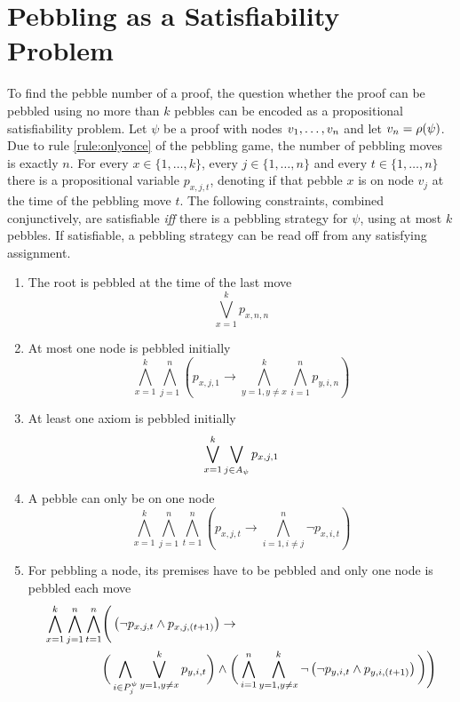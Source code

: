 \documentclass{llncs}
\begin{document}
\section{Pebbling as a Satisfiability Problem}
\label{sec:PebblingAsSat}

To find the pebble number of a proof, the question whether the proof can be pebbled using no more than $k$ pebbles can be encoded as a propositional satisfiability problem.
Let $\psi$ be a proof with nodes $v_1,\ldots,v_n$ and let $v_n = \rho(\psi)$. 
Due to rule \ref{rule:onlyonce} of the pebbling game, the number of pebbling moves is exactly $n$. For every $x \in \{1,\ldots,k\}$, every $j \in \{1,\ldots,n\}$ and every $t \in \{1,\ldots,n\}$ there is a propositional variable $p_{x,j,t}$, denoting if that pebble $x$ is on node $v_j$ at the time of the pebbling move $t$. The following constraints, combined conjunctively, are satisfiable \textit{iff} there is a pebbling strategy for $\psi$, using at most $k$ pebbles. If satisfiable, a pebbling strategy can be read off from any satisfying assignment.

\begin{enumerate}
	\item The root is pebbled at the time of the last move
				$$\bigvee_{x = 1}^k p_{x,n,n}$$
				
	\item At most one node is pebbled initially\\
				$$\bigwedge_{x = 1}^k \bigwedge_{j = 1}^n \left( p_{x,j,1} \rightarrow \bigwedge_{y = 1, y \neq x}^k \bigwedge_{i = 1}^n p_{y,i,n} \right)$$
	
	\item At least one axiom is pebbled initially\\
				$$\bigvee_{x = 1}^k \bigvee_{j \in A_{\psi}} p_{x,j,1}$$
				
	\item A pebble can only be on one node
				$$\bigwedge_{x = 1}^k \bigwedge_{j = 1}^n \bigwedge_{t = 1}^n \left( p_{x,j,t} \rightarrow \bigwedge_{i = 1, i \neq j}^n \neg p_{x,i,t} \right)$$ 
				
	\item \label{c:pebble} For pebbling a node, its premises have to be pebbled and only one node is pebbled each move\\
				\begin{align*}
					\bigwedge_{x = 1}^k \bigwedge_{j = 1}^n \bigwedge_{t = 1}^n & \Bigg( \left(\neg p_{x,j,t} \wedge p_{x,j,(t+1)} \right)\rightarrow \\
					&\bigg( \bigwedge_{i \in P_{j}^{\psi}} \bigvee_{y = 1, y \neq x}^k p_{y,i,t} \bigg) \wedge 
					\bigg( \bigwedge_{i = 1}^n \bigwedge_{y = 1, y \neq x}^k \neg \left( \neg p_{y,i,t} \wedge p_{y,i,(t+1)} \right) \bigg) \Bigg)
				\end{align*}
				
\end{enumerate}
\end{document}
